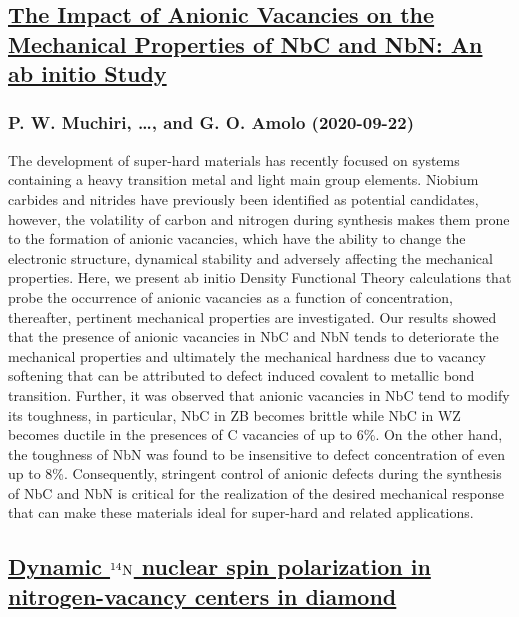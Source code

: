 {\subsection*{\href{http://arxiv.org/abs/2009.10519v1}{The Impact of Anionic Vacancies on the Mechanical Properties of NbC and  NbN: An ab initio Study}}
\subsubsection*{P. W. Muchiri, \dots, and G. O. Amolo (2020-09-22)}
The development of super-hard materials has recently focused on systems
containing a heavy transition metal and light main group elements. Niobium
carbides and nitrides have previously been identified as potential candidates,
however, the volatility of carbon and nitrogen during synthesis makes them
prone to the formation of anionic vacancies, which have the ability to change
the electronic structure, dynamical stability and adversely affecting the
mechanical properties. Here, we present ab initio Density Functional Theory
calculations that probe the occurrence of anionic vacancies as a function of
concentration, thereafter, pertinent mechanical properties are investigated.
Our results showed that the presence of anionic vacancies in NbC and NbN tends
to deteriorate the mechanical properties and ultimately the mechanical hardness
due to vacancy softening that can be attributed to defect induced covalent to
metallic bond transition. Further, it was observed that anionic vacancies in
NbC tend to modify its toughness, in particular, NbC in ZB becomes brittle
while NbC in WZ becomes ductile in the presences of C vacancies of up to 6\%. On
the other hand, the toughness of NbN was found to be insensitive to defect
concentration of even up to 8\%. Consequently, stringent control of anionic
defects during the synthesis of NbC and NbN is critical for the realization of
the desired mechanical response that can make these materials ideal for
super-hard and related applications.

\subsection*{\href{http://arxiv.org/abs/2009.10516v1}{Dynamic $^{14}\rm N$ nuclear spin polarization in nitrogen-vacancy  centers in diamond}}
}
